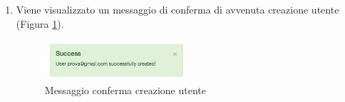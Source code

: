 \begin{enumerate}
			\item Viene visualizzato un messaggio di conferma di avvenuta creazione utente (Figura \ref{fig:confermaCreazioneUtente}).

				\begin{figure}[H]
					\centering \includegraphics[width=0.5\textwidth]{img/confermaCreazioneUtente.png}
					\caption{ \label{fig:confermaCreazioneUtente} Messaggio conferma creazione utente}
				\end{figure}

		\end{enumerate}  

	\clearpage
